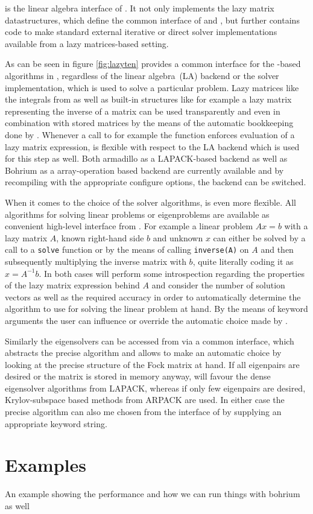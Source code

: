 \lazyten is the linear algebra interface of \molsturm.
It not only implements the lazy matrix datastructures,
which define the common interface of \gint and \gscf,
but further contains code to make standard external
iterative or direct solver implementations available
from a lazy matrices-based setting.

As can be seen in figure \ref{fig:lazyten} \lazyten provides
a common interface for the \contraction-based algorithms in \gscf,
regardless of the linear algebra~(LA) backend or the solver implementation,
which is used to solve a particular problem.
Lazy matrices like the integrals from \gint as well as built-in structures
like for example a lazy matrix representing the inverse of a matrix
can be used transparently and even in combination with stored matrices
by the means of the automatic bookkeeping done by \lazyten.
Whenever a call to for example the \contraction function enforces
evaluation of a lazy matrix expression,
\lazyten is flexible with respect to the LA backend which is used for
this step as well.
Both armadillo as a LAPACK-based backend as well as Bohrium as a array-operation based backend
are currently available and by recompiling \molsturm with the appropriate configure options,
the backend can be switched.

When it comes to the choice of the solver algorithms, \lazyten is even more flexible.
All algorithms for solving linear problems or eigenproblems are available as 
convenient high-level interface from \gscf.
For example a linear problem $A x = b$ with a lazy matrix $A$, known right-hand side $b$
and unknown $x$ can either be solved by a call to a \texttt{solve} function or by
the means of calling \texttt{inverse(A)} on $A$ and then subsequently
multiplying the inverse matrix with $b$, quite literally coding it as $x = A^{-1} b$.
In both cases \lazyten will perform some introspection regarding the properties of
the lazy matrix expression behind $A$ and consider the number of solution
vectors as well as the required accuracy in order to automatically determine the algorithm to use
for solving the linear problem at hand.
By the means of keyword arguments the user can influence or override the automatic
choice made by \lazyten.

Similarly the eigensolvers can be accessed from \gscf via a common interface,
which abstracts the precise algorithm and allows \lazyten to make an automatic
choice by looking at the precise structure of the Fock matrix at hand.
If all eigenpairs are desired or the matrix is stored in memory anyway,
\lazyten will favour the dense eigensolver algorithms from LAPACK,
whereas if only few eigenpairs are desired,
Krylov-subspace based methods from ARPACK are used.
In either case the precise algorithm can also me chosen from the \python interface
of \molsturm by supplying an appropriate keyword string.


\section{Examples}
An example showing the performance and how we can run things with bohrium as well
